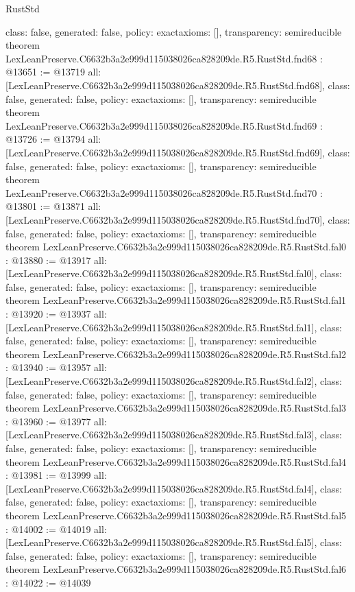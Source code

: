\begin{lexlean}{RustStd}
\begin{coremodule}
{  class: false,
  generated: false,
  policy: exact{axioms: []},
  transparency: semireducible
}
theorem LexLeanPreserve.C6632b3a2e999d115038026ca828209de.R5.RustStd.fnd68 : @13651 := @13719 {
  all: [LexLeanPreserve.C6632b3a2e999d115038026ca828209de.R5.RustStd.fnd68],
  class: false,
  generated: false,
  policy: exact{axioms: []},
  transparency: semireducible
}
theorem LexLeanPreserve.C6632b3a2e999d115038026ca828209de.R5.RustStd.fnd69 : @13726 := @13794 {
  all: [LexLeanPreserve.C6632b3a2e999d115038026ca828209de.R5.RustStd.fnd69],
  class: false,
  generated: false,
  policy: exact{axioms: []},
  transparency: semireducible
}
theorem LexLeanPreserve.C6632b3a2e999d115038026ca828209de.R5.RustStd.fnd70 : @13801 := @13871 {
  all: [LexLeanPreserve.C6632b3a2e999d115038026ca828209de.R5.RustStd.fnd70],
  class: false,
  generated: false,
  policy: exact{axioms: []},
  transparency: semireducible
}
theorem LexLeanPreserve.C6632b3a2e999d115038026ca828209de.R5.RustStd.fal0 : @13880 := @13917 {
  all: [LexLeanPreserve.C6632b3a2e999d115038026ca828209de.R5.RustStd.fal0],
  class: false,
  generated: false,
  policy: exact{axioms: []},
  transparency: semireducible
}
theorem LexLeanPreserve.C6632b3a2e999d115038026ca828209de.R5.RustStd.fal1 : @13920 := @13937 {
  all: [LexLeanPreserve.C6632b3a2e999d115038026ca828209de.R5.RustStd.fal1],
  class: false,
  generated: false,
  policy: exact{axioms: []},
  transparency: semireducible
}
theorem LexLeanPreserve.C6632b3a2e999d115038026ca828209de.R5.RustStd.fal2 : @13940 := @13957 {
  all: [LexLeanPreserve.C6632b3a2e999d115038026ca828209de.R5.RustStd.fal2],
  class: false,
  generated: false,
  policy: exact{axioms: []},
  transparency: semireducible
}
theorem LexLeanPreserve.C6632b3a2e999d115038026ca828209de.R5.RustStd.fal3 : @13960 := @13977 {
  all: [LexLeanPreserve.C6632b3a2e999d115038026ca828209de.R5.RustStd.fal3],
  class: false,
  generated: false,
  policy: exact{axioms: []},
  transparency: semireducible
}
theorem LexLeanPreserve.C6632b3a2e999d115038026ca828209de.R5.RustStd.fal4 : @13981 := @13999 {
  all: [LexLeanPreserve.C6632b3a2e999d115038026ca828209de.R5.RustStd.fal4],
  class: false,
  generated: false,
  policy: exact{axioms: []},
  transparency: semireducible
}
theorem LexLeanPreserve.C6632b3a2e999d115038026ca828209de.R5.RustStd.fal5 : @14002 := @14019 {
  all: [LexLeanPreserve.C6632b3a2e999d115038026ca828209de.R5.RustStd.fal5],
  class: false,
  generated: false,
  policy: exact{axioms: []},
  transparency: semireducible
}
theorem LexLeanPreserve.C6632b3a2e999d115038026ca828209de.R5.RustStd.fal6 : @14022 := @14039 {
}
\end{coremodule}
\end{lexlean}
